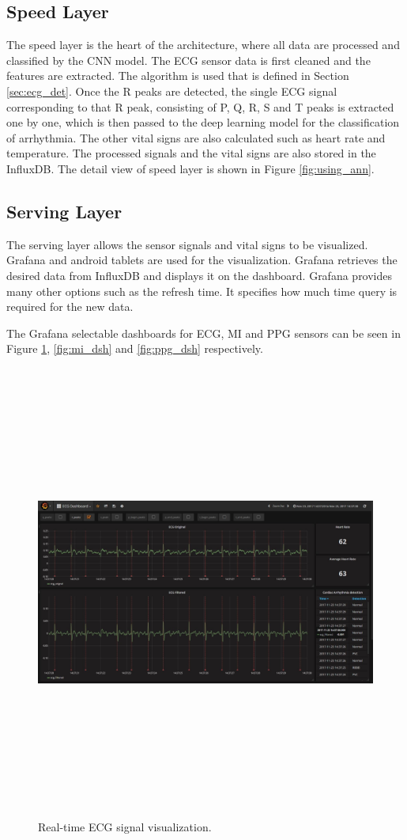 \subsection{Speed Layer}
The speed layer is the heart of the architecture, where all data are processed and classified by the CNN model. The ECG sensor data is first cleaned and the features are extracted. The algorithm is used that is defined in Section \ref{sec:ecg_det}. Once the R peaks are detected, the single ECG signal corresponding to that R peak, consisting of P, Q, R, S and T peaks is extracted one by one, which is then passed to the deep learning model for the classification of arrhythmia. The other vital signs are also calculated such as heart rate and temperature. The processed signals and the vital signs are also stored in the InfluxDB. The detail view of speed layer is shown in Figure \ref{fig:using_ann}.

\subsection{Serving Layer}
The serving layer allows the sensor signals and vital signs to be visualized. Grafana and android tablets are used for the visualization. Grafana retrieves the desired data from InfluxDB and displays it on the dashboard. Grafana provides many other options such as the refresh time. It specifies how much time query is required for the new data. 

The Grafana selectable dashboards for ECG, MI and PPG sensors can be seen in Figure \ref{fig:ecg_dsh}, \ref{fig:mi_dsh} and \ref{fig:ppg_dsh} respectively.


\begin{figure}[htpb]
	\centering
	\includegraphics[width=16cm,height=15cm,keepaspectratio=true]{images/ecg_dsh}
	\caption{
		Real-time ECG signal visualization.
	}
	\label{fig:ecg_dsh}
\end{figure}

